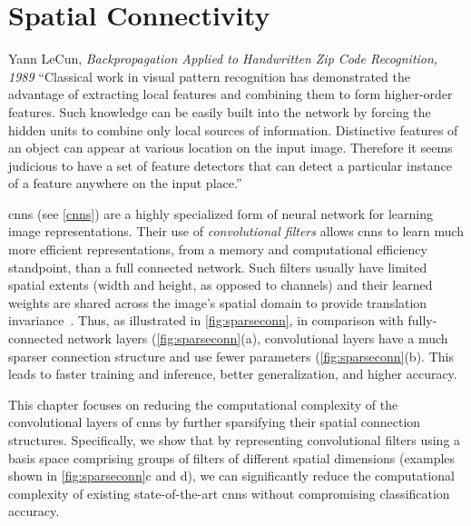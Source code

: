 \documentclass[thesis]{subfiles}
\begin{document}
	\chapter{Spatial Connectivity}\label{lowrankfilters}
	\begin{chapquote}{Yann LeCun, \textit{Backpropagation Applied to Handwritten Zip Code Recognition, 1989}}
        ``Classical work in visual pattern recognition has demonstrated the advantage of extracting local features and combining them to form higher-order features. Such knowledge can be easily built into the network by forcing the hidden units to combine only local sources of information. Distinctive features of an object can appear at various location on the input image. Therefore it seems judicious to have a set of feature detectors that can detect a particular instance of a feature anywhere on the input place.''
    \end{chapquote}
    
    \glspl{cnn} (see \cref{cnns}) are a highly specialized form of neural network for learning image representations. Their use of \emph{convolutional filters} allows \glspl{cnn} to learn much more efficient representations, from a memory and computational efficiency standpoint, than a full connected network. Such filters usually have limited spatial extents (\ie width and height, as opposed to channels) and their learned weights are shared across the image's spatial domain to provide translation invariance~\citep{Fuk80,Lecun1998}.
    Thus, as illustrated in \cref{fig:sparseconn}, in comparison with fully-connected network layers (\cref{fig:sparseconn}(a), convolutional layers have a much sparser connection structure and use fewer parameters (\cref{fig:sparseconn}(b).
    This leads to faster training and inference, better generalization, and higher accuracy.
    
    This chapter focuses on reducing the computational complexity of the convolutional layers of \glspl{cnn} by further sparsifying their spatial connection structures.  Specifically, we show that by representing convolutional filters using a basis space comprising groups of filters of different spatial dimensions (examples shown in \cref{fig:sparseconn}c and d), we can significantly reduce the computational complexity of existing state-of-the-art \glspl{cnn} without compromising classification accuracy.
    
\end{document}
